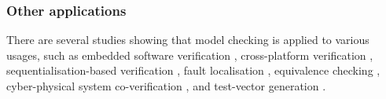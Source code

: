 \subsubsection{Other applications}
There are several studies showing that model checking is applied to various usages, such as embedded software verification \cite{Cordeiro:2009:SBM:1747491.1747515, BK11}, cross-platform verification \cite{0fbeb641779543c98fb1d6ff2180664c}, sequentialisation-based verification \cite{6693139}, fault localisation \cite{Griesmayer:2007:AFL:1247747.1248089}, equivalence checking \cite{Lee2011}, cyber-physical system co-verification \cite{6649878}, and test-vector generation \cite{Angeletti2009}.